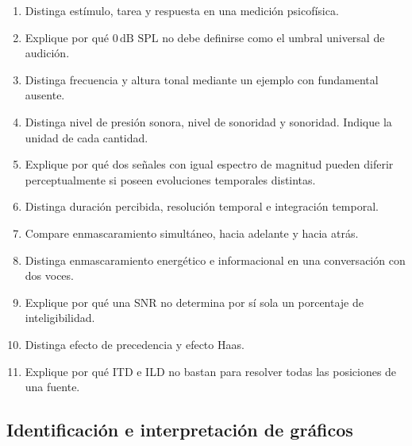 \begin{enumerate}[label=\textbf{C\arabic*.},leftmargin=*]
    \item Distinga estímulo, tarea y respuesta en una medición psicofísica.

    \item Explique por qué \(0\,\text{dB SPL}\) no debe definirse como el
    umbral universal de audición.

    \item Distinga frecuencia y altura tonal mediante un ejemplo con
    fundamental ausente.

    \item Distinga nivel de presión sonora, nivel de sonoridad y sonoridad.
    Indique la unidad de cada cantidad.

    \item Explique por qué dos señales con igual espectro de magnitud pueden
    diferir perceptualmente si poseen evoluciones temporales distintas.

    \item Distinga duración percibida, resolución temporal e integración
    temporal.

    \item Compare enmascaramiento simultáneo, hacia adelante y hacia atrás.

    \item Distinga enmascaramiento energético e informacional en una
    conversación con dos voces.

    \item Explique por qué una SNR no determina por sí sola un porcentaje de
    inteligibilidad.

    \item Distinga efecto de precedencia y efecto Haas.

    \item Explique por qué ITD e ILD no bastan para resolver todas las
    posiciones de una fuente.
\end{enumerate}

\subsection*{Identificación e interpretación de gráficos}

